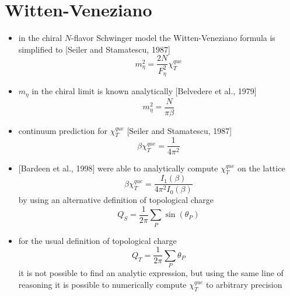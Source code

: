 \documentclass[a4paper,11pt]{article}
\begin{document}
\section{Witten-Veneziano}

  \begin{itemize}
    \item in the chiral $N$-flavor Schwinger model the
      Witten-Veneziano formula is simplified to [Seiler and
      Stamatescu, 1987]
      \[
        m_\eta^2 = \frac{2N}{F_\eta^2}\chi_T^{que}
      \]
    \item $m_\eta$ in the chiral limit is known analytically
      [Belvedere et al., 1979] 
      \[
        m_\eta^2 = \frac{N}{\pi\beta}
      \]
    \item continuum prediction for $\chi_T^{que}$
      [Seiler and Stamatescu, 1987]
      \[
        \beta\chi_T^{que} = \frac{1}{4\pi^2}
      \]
  \end{itemize}

  \begin{itemize}
    \item {[Bardeen et al., 1998]} were able to analytically
      compute $\chi_T^{que}$ on the lattice
      \[
        \beta\chi_T^{que} = \frac{I_1(\beta)}{4 \pi^2 I_0(\beta)}
      \]
      \setlength{\abovedisplayskip}{6pt}
      by using an alternative definition of topological charge
      \[
        Q_S = \frac{1}{2\pi}\sum_{P}\sin(\theta_P)
      \]
    \setlength{\belowdisplayskip}{4pt} 
    \item for the usual definition of topological charge
      \[
        Q_T = \frac{1}{2\pi}\sum_{P}\theta_P
      \] 
      it is not possible to find an analytic expression, but using the 
      same line of reasoning it is possible to numerically compute
      $\chi_T^{que}$ to arbitrary precision
  \end{itemize}
\end{document}

